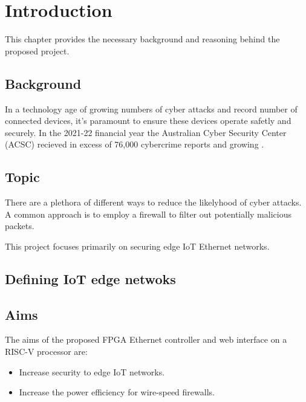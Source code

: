 \chapter[Introduction]{Introduction}
\label{Chap:Intro}




This chapter provides the necessary background and reasoning behind the proposed project. 

\section{Background }


In a technology age of growing numbers of cyber attacks and record number of connected devices, it's 
paramount to ensure these devices operate safetly and securely. In the 2021-22 financial year the Australian Cyber Security Center (ACSC) recieved in 
excess of 76,000 cybercrime reports and growing \cite{acsc_2022}. 

\section{Topic}


There are a plethora of different ways to reduce the likelyhood of cyber attacks.
A common approach is to employ a firewall to filter out potentially malicious packets. 

This project focuses primarily on securing edge IoT Ethernet networks. 

\section{Defining IoT edge netwoks}


\section{Aims}

The aims of the proposed FPGA Ethernet controller and web interface on a RISC-V processor are:

\begin{itemize}
    \item Increase security to edge IoT networks.
    \item Increase the power efficiency for wire-speed firewalls.
\end{itemize}


